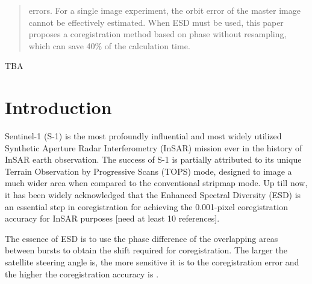 \documentclass[preprint, authoryear]{elsarticle}
\begin{document}
\begin{frontmatter}
\begin{abstract}
errors. For a single image experiment, the orbit error of the master image cannot be effectively estimated. When ESD must be used, this paper proposes a coregistration method based on phase without resampling, which can save 40\% of the calculation time.
%
\end{abstract}

\begin{keyword}
TBA
%
\end{keyword}

\end{frontmatter}




\section{Introduction}

Sentinel-1 (S-1) is the most profoundly influential and most widely utilized Synthetic Aperture Radar Interferometry (InSAR) mission ever in the history of InSAR earth observation. The success of S-1 is partially attributed to its unique Terrain Observation by Progressive Scans (TOPS) mode, designed to image a much wider area when compared to the conventional stripmap mode. Up till now, it has been widely acknowledged that the Enhanced Spectral Diversity (ESD) is an essential step in coregistration for achieving the 0.001-pixel coregistration accuracy for InSAR purposes [need at least 10 references].


The essence of ESD is to use the phase difference of the overlapping areas between bursts to obtain the shift required for coregistration. The larger the satellite steering angle is, the more sensitive it is to the coregistration error and the higher the coregistration accuracy is \cite{TOPS_Interferometry_With_TerraSAR-X}. 
\end{document}
